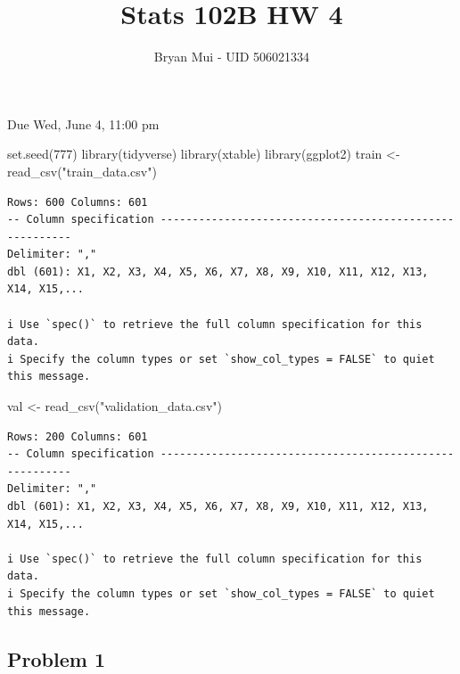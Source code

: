 \documentclass[
  letterpaper,
  DIV=11,
  numbers=noendperiod]{scrartcl}
\title{Stats 102B HW 4}
\author{Bryan Mui - UID 506021334}
\date{}
\newenvironment{Shaded}{\begin{snugshade}}{\end{snugshade}}
\newcommand{\DecValTok}[1]{\textcolor[rgb]{0.68,0.00,0.00}{#1}}
\newcommand{\FunctionTok}[1]{\textcolor[rgb]{0.28,0.35,0.67}{#1}}
\newcommand{\NormalTok}[1]{\textcolor[rgb]{0.00,0.23,0.31}{#1}}
\newcommand{\OtherTok}[1]{\textcolor[rgb]{0.00,0.23,0.31}{#1}}
\newcommand{\StringTok}[1]{\textcolor[rgb]{0.13,0.47,0.30}{#1}}
\begin{document}
\maketitle


Due Wed, June 4, 11:00 pm

\begin{Shaded}
\begin{Highlighting}[]
\FunctionTok{set.seed}\NormalTok{(}\DecValTok{777}\NormalTok{)}
\FunctionTok{library}\NormalTok{(tidyverse)}
\FunctionTok{library}\NormalTok{(xtable)}
\FunctionTok{library}\NormalTok{(ggplot2)}
\NormalTok{train }\OtherTok{\textless{}{-}} \FunctionTok{read\_csv}\NormalTok{(}\StringTok{"train\_data.csv"}\NormalTok{)}
\end{Highlighting}
\end{Shaded}

\begin{verbatim}
Rows: 600 Columns: 601
-- Column specification --------------------------------------------------------
Delimiter: ","
dbl (601): X1, X2, X3, X4, X5, X6, X7, X8, X9, X10, X11, X12, X13, X14, X15,...

i Use `spec()` to retrieve the full column specification for this data.
i Specify the column types or set `show_col_types = FALSE` to quiet this message.
\end{verbatim}

\begin{Shaded}
\begin{Highlighting}[]
\NormalTok{val }\OtherTok{\textless{}{-}} \FunctionTok{read\_csv}\NormalTok{(}\StringTok{"validation\_data.csv"}\NormalTok{)}
\end{Highlighting}
\end{Shaded}

\begin{verbatim}
Rows: 200 Columns: 601
-- Column specification --------------------------------------------------------
Delimiter: ","
dbl (601): X1, X2, X3, X4, X5, X6, X7, X8, X9, X10, X11, X12, X13, X14, X15,...

i Use `spec()` to retrieve the full column specification for this data.
i Specify the column types or set `show_col_types = FALSE` to quiet this message.
\end{verbatim}

\newpage

\subsection{Problem 1}\label{problem-1}
\end{document}
